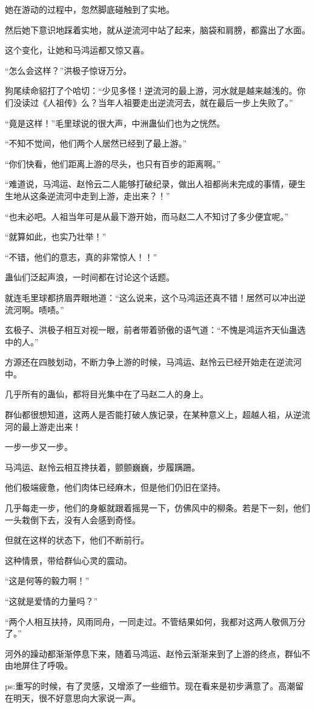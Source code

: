 \begin{this_body}
她在游动的过程中，忽然脚底碰触到了实地。

然后她下意识地踩着实地，就从逆流河中站了起来，脑袋和肩膀，都露出了水面。

这个变化，让她和马鸿运都又惊又喜。

“怎么会这样？”洪极子惊讶万分。

狗尾续命貂打了个哈切：“少见多怪！逆流河的最上游，河水就是越来越浅的。你们没读过《人祖传》么？当年人祖要走出逆流河去，就在最后一步上失败了。”

“竟是这样！”毛里球说的很大声，中洲蛊仙们也为之恍然。

“不知不觉间，他们两个人居然已经到了最上游。”

“你们快看，他们距离上游的尽头，也只有百步的距离啊。”

“难道说，马鸿运、赵怜云二人能够打破纪录，做出人祖都尚未完成的事情，硬生生地从这条逆流河中走到上游，走出来？！”

“也未必吧。人祖当年可是从最下游开始，而马赵二人不知讨了多少便宜呢。”

“就算如此，也实乃壮举！”

“不错，他们的意志，真的非常惊人！！”

蛊仙们泛起声浪，一时间都在讨论这个话题。

就连毛里球都挤眉弄眼地道：“这么说来，这个马鸿运还真不错！居然可以冲出逆流河啊。啧啧。”

玄极子、洪极子相互对视一眼，前者带着骄傲的语气道：“不愧是鸿运齐天仙蛊选中的人。”

方源还在四肢划动，不断力争上游的时候，马鸿运、赵怜云已经开始走在逆流河中。

几乎所有的蛊仙，都将目光集中在了马赵二人的身上。

群仙都很想知道，这两人是否能打破人族记录，在某种意义上，超越人祖，从逆流河的最上游走出来！

一步一步又一步。

马鸿运、赵怜云相互搀扶着，颤颤巍巍，步履蹒跚。

他们极端疲惫，他们肉体已经麻木，但是他们仍旧在坚持。

几乎每走一步，他们的身躯就跟着摇晃一下，仿佛风中的柳条。若是下一刻，他们一头栽倒下去，没有人会感到奇怪。

但就在这样的状态下，他们不断前行。

这种情景，带给群仙心灵的震动。

“这是何等的毅力啊！”

“这就是爱情的力量吗？”

“两个人相互扶持，风雨同舟，一同走过。不管结果如何，我都对这两人敬佩万分了。”

河外的躁动都渐渐停息下来，随着马鸿运、赵怜云渐渐来到了上游的终点，群仙不由地屏住了呼吸。

ps:重写的时候，有了灵感，又增添了一些细节。现在看来是初步满意了。高潮留在明天，很不好意思向大家说一声。

\end{this_body}

